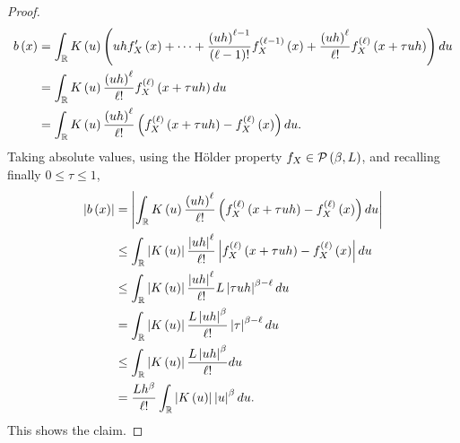 \begin{proof}
\begin{equation*}
  \begin{split}
    b\left(x\right) &= \int_{\mathbb{R}} K\left(u\right) \left(uh f_X'\left(x\right) + \cdots  + \frac{\left(uh\right)^{\ell -1}}{\left(\ell -1\right)!} f_X^{\left(\ell -1\right)}\left(x\right)+ \frac{\left(uh\right)^\ell}{\ell !}f_X^{\left(\ell\right)}\left(x+\tau uh \right)\right) du\\
    &= \int_{\mathbb{R}} K\left(u\right) \frac{\left(uh\right)^\ell}{\ell !}f_X^{\left(\ell\right)}\left(x+\tau uh \right) du \\
    &= \int_{\mathbb{R}} K\left(u\right) \frac{\left(uh\right)^\ell}{\ell !} \left( f_X^{\left(\ell\right)}\left(x+\tau uh \right) - f_X^{\left(\ell\right)}\left(x\right)\right) du.
    \end{split}
  \end{equation*}
  Taking absolute values, using the Hölder property $f_X\in \mathcal{P}\left(\beta, L\right)$, and recalling finally $0\leq \tau \leq 1$,
  \begin{equation*}
    \begin{split}
      \left| b\left(x\right)\right| &= \left| \int_{\mathbb{R}} K\left(u\right) \frac{\left(uh\right)^\ell}{\ell !} \left( f_X^{\left(\ell\right)}\left(x+\tau uh \right) - f_X^{\left(\ell\right)}\left(x\right)\right) du\right| \\
      &\leq \int_{\mathbb{R}} \left| K\left(u\right)\right| \frac{\left| uh\right|^\ell}{\ell !} \left|  f_X^{\left(\ell\right)}\left(x+\tau uh \right) - f_X^{\left(\ell\right)}\left(x\right)\right| du \\
      &\leq \int_{\mathbb{R}} \left| K\left(u\right)\right| \frac{\left| uh\right|^\ell}{\ell !} L\left| \tau u h\right|^{\beta - \ell} du \\
      &= \int_{\mathbb{R}} \left| K\left(u\right)\right|  \frac{L\left| uh\right|^{\beta}}{\ell !} \left| \tau\right|^{\beta - \ell} du \\
      &\leq  \int_{\mathbb{R}} \left| K\left(u\right)\right|  \frac{L\left| uh\right|^{\beta}}{\ell !} du \\
      &= \frac{L h^\beta}{\ell !}\int_{\mathbb{R}} \left| K\left(u\right)\right|\left| u\right|^{\beta} du.   \end{split}
  \end{equation*}
  This shows the claim.
\end{proof}
